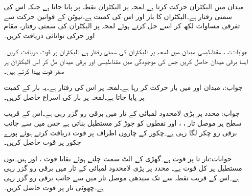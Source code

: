 \newpage
{}
میدان  میں الیکٹران  حرکت کرتا ہے۔لمحہ  پر الیکٹران نقطہ  پر پایا جاتا ہے جبکہ اس کی سمتی رفتار  ہے۔الیکٹران کا بار  اور اس کی کمیت  ہے۔نیوٹن کے قوانین حرکت سے تفرقی مساوات لکھ کر اسے حل کرتے ہوئے لمحہ  پر الیکٹران کی سمتی رفتار، مقام اور حرکی توانائی دریافت کریں۔

جوابات:، ، 
مقناطیسی میدان  میں لمحہ  پر الیکٹران کی سمتی رفتار  ہے۔الیکٹران پر قوت دریافت کریں۔ایسا برقی میدان حاصل کریں جس کی موجودگی میں مقناطیسی اور برقی میدان مل کر اس الیکٹران پر صفر قوت  پیدا کرتے ہیں۔

جواب:، 
میدان  اور  میں بار  حرکت کر رہا ہے۔لمحہ  پر اس کی رفتار  ہے۔یہ بار  کے کمیت پر پایا جاتا ہے۔لمحہ  پر بار کی اسراع حاصل کریں۔

جواب:
محدد  پر پڑی لامحدود لمبائی کے تار میں  برقی رو گزر رہی ہے۔اس کے قریب سطح  پر موصل تار ، ،  اور  نقطوں کو جوڑ کر مستطیل بناتی ہے جس میں  سے  جانب  برقی رو چکر  لگا رہی ہے۔چکور کے چاروں اطراف پر قوت دریافت کرتے ہوئے پورے چکور پر قوت حاصل کریں۔

جوابات:تار  تا  پر قوت  ہے۔گھڑی کے الٹ سمت چلتے ہوئے بقایا قوت  ،  اور  ہیں۔یوں مستطیل پر کل قوت  ہے۔
محدد  پر پڑی لامحدود لمبائی کے تار میں  برقی رو گزر رہی ہے۔اس کے قریب نقطہ  سے  تک سیدھی موصل تار میں  سے  جانب  برقی رو گزر رہی ہے۔چھوٹی تار پر قوت حاصل کریں۔

